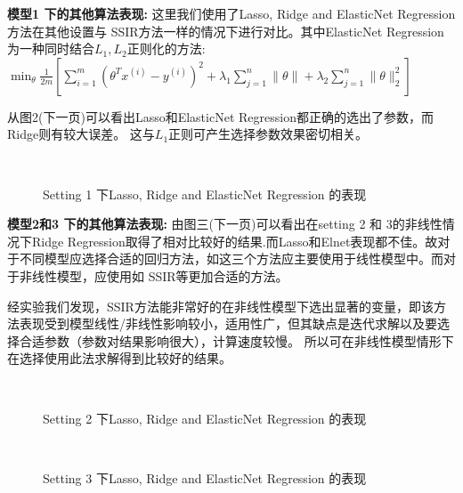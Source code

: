 \documentclass[lang=cn,11pt,a4paper]{elegantpaper}
\newcommand{\Blue}[1]{\textcolor[rgb]{0,0,0.803}{#1}}
\begin{document}
\textbf{\Blue{模型1 下的其他算法表现:}} 这里我们使用了Lasso, Ridge and ElasticNet Regression方法在其他设置与 SSIR方法一样的情况下进行对比。其中ElasticNet Regression为一种同时结合$ L_1,L_2$正则化的方法:
$\min _{\theta} \frac{1}{2 m}\left[\sum_{i=1}^{m}\left(\theta^{T} x^{(i)}-y^{(i)}\right)^{2}+\lambda_{1} \sum_{j=1}^{n}\|\theta\|+\lambda_{2} \sum_{j=1}^{n}\|\theta\|_{2}^{2}\right]$

从图2(下一页)可以看出Lasso和ElasticNet Regression都正确的选出了参数，而Ridge则有较大误差。 这与$L_1$正则可产生选择参数效果密切相关。 

\begin{figure}[!h]
\centering
{} 
\\ %
\centering
{}
\caption{Setting 1 下Lasso, Ridge and ElasticNet Regression 的表现} %
\end{figure}


\textbf{\Blue{模型2和3 下的其他算法表现:}} 由图三(下一页)可以看出在setting 2 和 3的非线性情况下Ridge Regression取得了相对比较好的结果.而Lasso和Elnet表现都不佳。故对于不同模型应选择合适的回归方法，如这三个方法应主要使用于线性模型中。而对于非线性模型，应使用如 SSIR等更加合适的方法。

经实验我们发现，SSIR方法能非常好的在非线性模型下选出显著的变量，即该方法表现受到模型线性/非线性影响较小，适用性广，但其缺点是迭代求解以及要选择合适参数（参数对结果影响很大），计算速度较慢。 所以可在非线性模型情形下在选择使用此法求解得到比较好的结果。
\begin{figure}[!h]
\centering
{} 
\\ %
\centering
{}
\caption{Setting 2 下Lasso, Ridge and ElasticNet Regression 的表现} %
\end{figure}

\begin{figure}[!h]
\centering
{} 
\\ %
\centering
{}
\caption{Setting 3 下Lasso, Ridge and ElasticNet Regression 的表现} %
\end{figure}
\end{document}
